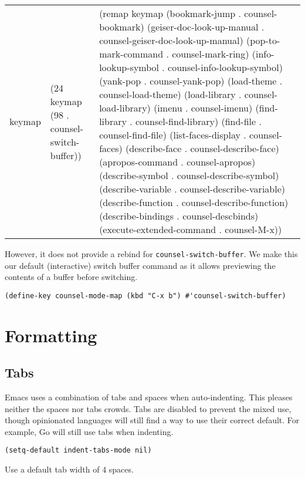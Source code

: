\documentclass[11pt]{article}
\begin{document}
\begin{table}[htbp]
\label{tab:orgb51afc9}
\centering
\begin{tabular}{lll}
keymap & (24 keymap (98 . counsel-switch-buffer)) & (remap keymap (bookmark-jump . counsel-bookmark) (geiser-doc-look-up-manual . counsel-geiser-doc-look-up-manual) (pop-to-mark-command . counsel-mark-ring) (info-lookup-symbol . counsel-info-lookup-symbol) (yank-pop . counsel-yank-pop) (load-theme . counsel-load-theme) (load-library . counsel-load-library) (imenu . counsel-imenu) (find-library . counsel-find-library) (find-file . counsel-find-file) (list-faces-display . counsel-faces) (describe-face . counsel-describe-face) (apropos-command . counsel-apropos) (describe-symbol . counsel-describe-symbol) (describe-variable . counsel-describe-variable) (describe-function . counsel-describe-function) (describe-bindings . counsel-descbinds) (execute-extended-command . counsel-M-x))\\
\end{tabular}
\end{table}

However, it does not provide a rebind for \texttt{counsel-switch-buffer}. We make this
our default (interactive) switch buffer command as it allows previewing the
contents of a buffer before switching.

\begin{verbatim}
(define-key counsel-mode-map (kbd "C-x b") #'counsel-switch-buffer)
\end{verbatim}
\section{Formatting}
\label{sec:orgde0b80c}

\subsection{Tabs}
\label{sec:org5c55f4f}

Emacs uses a combination of tabs and spaces when auto-indenting. This pleases
neither the spaces nor tabs crowds. Tabs are disabled to prevent the mixed use,
though opinionated languages will still find a way to use their correct
default. For example, Go will still use tabs when indenting.

\begin{verbatim}
(setq-default indent-tabs-mode nil)
\end{verbatim}

Use a default tab width of 4 spaces.
\end{document}
